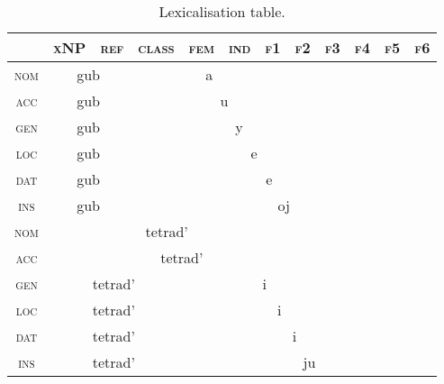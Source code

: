 \begin{table}[H]
\centering
\begin{tabular}{c c c c c c c c c c c c}
\toprule
\textsc{}&\textsc{xNP}&\textsc{ref}&\textsc{class}&\textsc{fem}&\textsc{ind}&\textsc{f1}&\textsc{f2}&\textsc{f3}&\textsc{f4}&\textsc{f5}&\textsc{f6}\\
\midrule
\textsc{nom}&\multicolumn{2}{|c|}{\cellcolor{gray!70}gub}&\multicolumn{4}{c}{\cellcolor{gray!30}a}&&&&&\\
\textsc{acc}&\multicolumn{2}{|c|}{\cellcolor{gray!70}gub}&\multicolumn{5}{c}{\cellcolor{gray!30}u}&&&&\\
\textsc{gen}&\multicolumn{2}{|c|}{\cellcolor{gray!70}gub}&\multicolumn{6}{c}{\cellcolor{gray!30}y}&&&\\
\textsc{loc}&\multicolumn{2}{|c|}{\cellcolor{gray!70}gub}&\multicolumn{7}{c}{\cellcolor{gray!30}e}&&\\
\textsc{dat}&\multicolumn{2}{|c|}{\cellcolor{gray!70}gub}&\multicolumn{8}{c}{\cellcolor{gray!30}e}&\\
\textsc{ins}&\multicolumn{2}{|c|}{\cellcolor{gray!70}gub}&\multicolumn{9}{c}{\cellcolor{gray!30}oj}\\
\midrule
\textsc{nom}&\multicolumn{6}{|c|}{\cellcolor{gray!70}tetrad'}&&&&&\\
\textsc{acc}&\multicolumn{7}{|c|}{\cellcolor{gray!70}tetrad'}&&&&\\
\textsc{gen}&\multicolumn{3}{|c|}{\cellcolor{gray!70}tetrad'}&\multicolumn{5}{c}{\cellcolor{gray!30}i}&&&\\
\textsc{loc}&\multicolumn{3}{|c|}{\cellcolor{gray!70}tetrad'}&\multicolumn{6}{c}{\cellcolor{gray!30}i}&&\\
\textsc{dat}&\multicolumn{3}{|c|}{\cellcolor{gray!70}tetrad'}&\multicolumn{7}{c}{\cellcolor{gray!30}i}&\\
\textsc{ins}&\multicolumn{3}{|c|}{\cellcolor{gray!70}tetrad'}&\multicolumn{8}{c}{\cellcolor{gray!30}ju}\\
\bottomrule
\end{tabular}
\caption{Lexicalisation table.}
\label{tab:iifem}
\end{table}


\usepackage{pifont}



